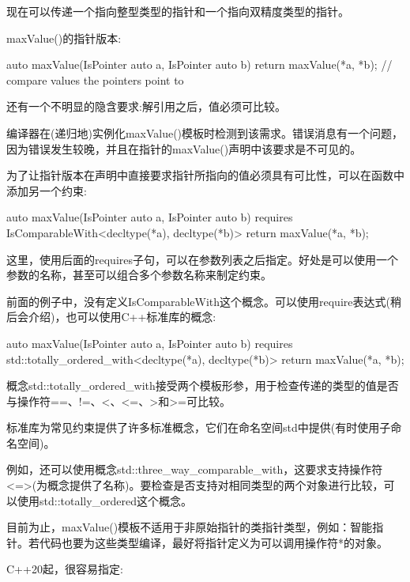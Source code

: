 现在可以传递一个指向整型类型的指针和一个指向双精度类型的指针。


maxValue()的指针版本:

\begin{cpp}
auto maxValue(IsPointer auto a, IsPointer auto b)
{
	return maxValue(*a, *b); // compare values the pointers point to
}
\end{cpp}

还有一个不明显的隐含要求:解引用之后，值必须可比较。

编译器在(递归地)实例化maxValue()模板时检测到该需求。错误消息有一个问题，因为错误发生较晚，并且在指针的maxValue()声明中该要求是不可见的。

为了让指针版本在声明中直接要求指针所指向的值必须具有可比性，可以在函数中添加另一个约束:

\begin{cpp}
auto maxValue(IsPointer auto a, IsPointer auto b)
requires IsComparableWith<decltype(*a), decltype(*b)>
{
	return maxValue(*a, *b);
}
\end{cpp}

这里，使用后面的requires子句，可以在参数列表之后指定。好处是可以使用一个参数的名称，甚至可以组合多个参数名称来制定约束。


前面的例子中，没有定义IsComparableWith这个概念。可以使用require表达式(稍后会介绍)，也可以使用C++标准库的概念:

\begin{cpp}
auto maxValue(IsPointer auto a, IsPointer auto b)
requires std::totally_ordered_with<decltype(*a), decltype(*b)>
{
	return maxValue(*a, *b);
}
\end{cpp}

概念std::totally\_ordered\_with接受两个模板形参，用于检查传递的类型的值是否与操作符==、!=、<、<=、>和>=可比较。

标准库为常见约束提供了许多标准概念，它们在命名空间std中提供(有时使用子命名空间)。

例如，还可以使用概念std::three\_way\_comparable\_with，这要求支持操作符<=>(为概念提供了名称)。要检查是否支持对相同类型的两个对象进行比较，可以使用std::totally\_ordered这个概念。


目前为止，maxValue()模板不适用于非原始指针的类指针类型，例如：智能指针。若代码也要为这些类型编译，最好将指针定义为可以调用操作符*的对象。

C++20起，很容易指定:

